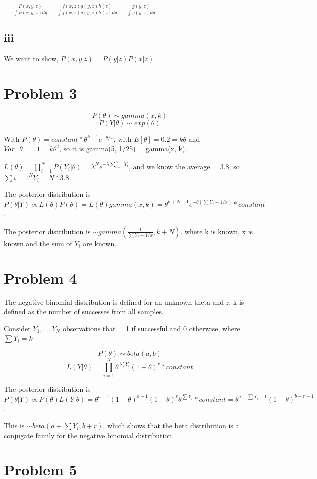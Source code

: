 \documentclass{article}
\begin{document}
$= \frac{P(x,y,z)}{\int\!{P(x,y,z)dy}} = \frac{f(x,z)g(y,z)h(z)}{\int\!{f(x,z)g(y,z)h(z)dy}} = \frac{g(y,z)}{\int\!{g(y,z)dy}}$

\subsection{iii}
We want to show,
$P(x,y|z) = P(y|z)P(x|z)$

\section{Problem 3}
$$P(\theta) \sim gamma(x, k)$$
$$P(Y|\theta) \sim exp(\theta)$$


With $P(\theta) = constant * \theta^{k-1}e^{-\theta/x}$, with $E[\theta]=0.2=k\theta$ and $Var[\theta]=1=k\theta^2$, so it is gamma(5, 1/25) = gamma(x, k).


$L(\theta) = \prod_{i=1}^NP(Y_i|\theta) = \lambda^Ne^{-\lambda\sum_{i=1}^NY_i}$, and we know the average = 3.8, so $\sum{i=1}^NY_i = N*3.8$.


The posterior distribution is $P(\theta|Y) \propto L(\theta)P(\theta) = L(\theta)gamma(x,k) = \theta^{k+N-1}e^{-\theta(\sum Y_i + 1/x)} * constant$.


The posterior distribution is $\sim gamma(\frac{1}{\sum Y_i + 1/x}, k + N)$. where k is known, x is known and the sum of $Y_i$ are known. 

\section{Problem 4}
The negative binomial distribution is defined for an unknown theta and r. k is defined as the number of successes from all samples.

Consider $Y_1, ..., Y_N$ observations that = 1 if successful and 0 otherwise, where $\sum Y_i = k$

$$P(\theta) \sim beta(a,b)$$
$$L(Y|\theta) = \prod_{i=1}^N \theta^{\sum Y_i} (1-\theta)^r * constant$$

The posterior distribution is $P(\theta|Y) \propto P(\theta)L(Y|\theta) = \theta^{a-1}(1-\theta)^{b-1}(1-\theta)^{r}\theta^{\sum Y_i} * constant = \theta^{a+\sum Y_i - 1} (1-\theta)^{b+r-1}$. 

This is $\sim beta(a + \sum Y_i, b+r)$, which shows that the beta distribution is a conjugate family for the negative binomial distribution. 

\section{Problem 5}
\end{document}
